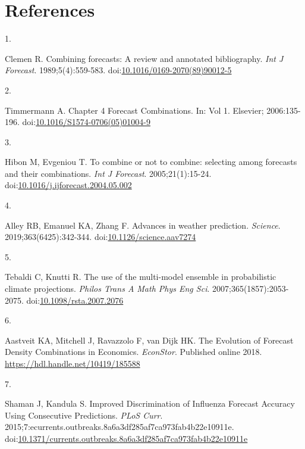 \documentclass[
]{article}
\newlength{\cslhangindent}
\newlength{\csllabelwidth}
\newenvironment{CSLReferences}[2] %
 {\begin{list}{}{%
  \setlength{\itemindent}{0pt}
  \setlength{\leftmargin}{0pt}
  \setlength{\parsep}{0pt}
  \ifodd #1
   \setlength{\leftmargin}{\cslhangindent}
   \setlength{\itemindent}{-1\cslhangindent}
  \fi
  \setlength{\itemsep}{#2\baselineskip}}}
 {\end{list}}
\newcommand{\CSLLeftMargin}[1]{\parbox[t]{\csllabelwidth}{\strut#1\strut}}
\newcommand{\CSLRightInline}[1]{\parbox[t]{\linewidth - \csllabelwidth}{\strut#1\strut}}
\begin{document}
\section*{References}\label{references}

\label{refs}
\begin{CSLReferences}{0}{1}
\CSLLeftMargin{1. }%
\CSLRightInline{Clemen R. Combining forecasts: A review and annotated
bibliography. \emph{Int J Forecast}. 1989;5(4):559-583.
doi:\href{https://doi.org/10.1016/0169-2070(89)90012-5}{10.1016/0169-2070(89)90012-5}}

\CSLLeftMargin{2. }%
\CSLRightInline{Timmermann A. Chapter 4 Forecast Combinations. In: Vol
1. Elsevier; 2006:135-196.
doi:\href{https://doi.org/10.1016/S1574-0706(05)01004-9}{10.1016/S1574-0706(05)01004-9}}

\CSLLeftMargin{3. }%
\CSLRightInline{Hibon M, Evgeniou T. To combine or not to combine:
selecting among forecasts and their combinations. \emph{Int J Forecast}.
2005;21(1):15-24.
doi:\href{https://doi.org/10.1016/j.ijforecast.2004.05.002}{10.1016/j.ijforecast.2004.05.002}}

\CSLLeftMargin{4. }%
\CSLRightInline{Alley RB, Emanuel KA, Zhang F. Advances in weather
prediction. \emph{Science}. 2019;363(6425):342-344.
doi:\href{https://doi.org/10.1126/science.aav7274}{10.1126/science.aav7274}}

\CSLLeftMargin{5. }%
\CSLRightInline{Tebaldi C, Knutti R. The use of the multi-model ensemble
in probabilistic climate projections. \emph{Philos Trans A Math Phys Eng
Sci}. 2007;365(1857):2053-2075.
doi:\href{https://doi.org/10.1098/rsta.2007.2076}{10.1098/rsta.2007.2076}}

\CSLLeftMargin{6. }%
\CSLRightInline{Aastveit KA, Mitchell J, Ravazzolo F, van Dijk HK. The
Evolution of Forecast Density Combinations in Economics.
\emph{EconStor}. Published online 2018.
\url{https://hdl.handle.net/10419/185588}}

\CSLLeftMargin{7. }%
\CSLRightInline{Shaman J, Kandula S. Improved {Discrimination} of
{Influenza} {Forecast} {Accuracy} {Using} {Consecutive} {Predictions}.
\emph{PLoS Curr}.
2015;7:ecurrents.outbreaks.8a6a3df285af7ca973fab4b22e10911e.
doi:\href{https://doi.org/10.1371/currents.outbreaks.8a6a3df285af7ca973fab4b22e10911e}{10.1371/currents.outbreaks.8a6a3df285af7ca973fab4b22e10911e}}


\end{CSLReferences}
\end{document}
